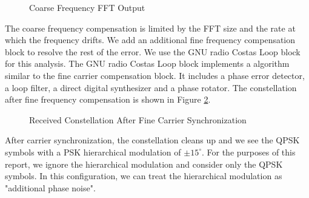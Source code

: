 \documentclass[conference,onecolumn]{IEEEtran}
\begin{document}
\begin{figure}[H]
	\centerline{}
	\caption{Coarse Frequency FFT Output}
	\label{fig::cfo_frequency_estimate}
\end{figure}

The coarse frequency compensation is limited by the FFT size and the rate at which the frequency drifts. We add an additional fine frequency compensation block to resolve the rest of the error. We use the GNU radio Costas Loop block for this analysis. The GNU radio Costas Loop block implements a algorithm similar to the fine carrier compensation block. It includes a phase error detector, a loop filter, a direct digital synthesizer and a phase rotator. The constellation after fine frequency compensation is shown in Figure \ref{fig::constellation_after_fine_carrier_comp}.

\begin{figure}[H]
	\centerline{}
	\caption{Received Constellation After Fine Carrier Synchronization}
	\label{fig::constellation_after_fine_carrier_comp}
\end{figure}

\noindent After carrier synchronization, the constellation cleans up and we see the QPSK symbols with a PSK hierarchical modulation of $\pm15^{\circ}$. For the purposes of this report, we ignore the hierarchical modulation and consider only the QPSK symbols. In this configuration, we can treat the hierarchical modulation as "additional phase noise".

\end{document}
